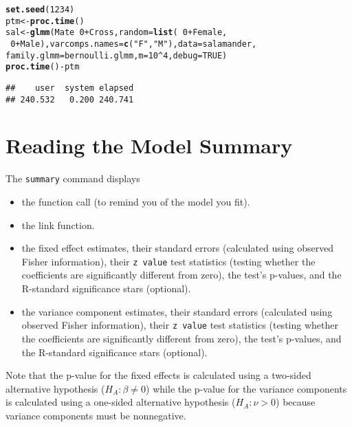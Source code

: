 \documentclass[11pt]{article}\usepackage[]{graphicx}\usepackage[]{color}
\makeatletter
\newcommand{\hlnum}[1]{\textcolor[rgb]{0.686,0.059,0.569}{#1}}%
\newcommand{\hlstr}[1]{\textcolor[rgb]{0.192,0.494,0.8}{#1}}%
\newcommand{\hlopt}[1]{\textcolor[rgb]{0,0,0}{#1}}%
\newcommand{\hlstd}[1]{\textcolor[rgb]{0.345,0.345,0.345}{#1}}%
\newcommand{\hlkwb}[1]{\textcolor[rgb]{0.69,0.353,0.396}{#1}}%
\newcommand{\hlkwc}[1]{\textcolor[rgb]{0.333,0.667,0.333}{#1}}%
\newcommand{\hlkwd}[1]{\textcolor[rgb]{0.737,0.353,0.396}{\textbf{#1}}}%
\newenvironment{kframe}{%
 \def\at@end@of@kframe{}%
 \ifinner\ifhmode%
  \def\at@end@of@kframe{\end{minipage}}%
  \begin{minipage}{\columnwidth}%
 \fi\fi%
 \def\FrameCommand##1{\hskip\@totalleftmargin \hskip-\fboxsep
 \colorbox{shadecolor}{##1}\hskip-\fboxsep
     \hskip-\linewidth \hskip-\@totalleftmargin \hskip\columnwidth}%
 \MakeFramed {\advance\hsize-\width
   \@totalleftmargin\z@ \linewidth\hsize
   \@setminipage}}%
 {\par\unskip\endMakeFramed%
 \at@end@of@kframe}
\newenvironment{knitrout}{}{} %
\makeatother
\begin{document}
\begin{knitrout}
\color{fgcolor}\begin{kframe}
\begin{alltt}
\hlkwd{set.seed}\hlstd{(}\hlnum{1234}\hlstd{)}
\hlstd{ptm}\hlkwb{<-}\hlkwd{proc.time}\hlstd{()}
\hlstd{sal} \hlkwb{<-} \hlkwd{glmm}\hlstd{(Mate} \hlopt{~} \hlnum{0} \hlopt{+} \hlstd{Cross,} \hlkwc{random} \hlstd{=} \hlkwd{list}\hlstd{(}\hlopt{~} \hlnum{0} \hlopt{+} \hlstd{Female,}
\hlopt{~} \hlnum{0} \hlopt{+} \hlstd{Male),} \hlkwc{varcomps.names} \hlstd{=} \hlkwd{c}\hlstd{(}\hlstr{"F"}\hlstd{,} \hlstr{"M"}\hlstd{),} \hlkwc{data} \hlstd{= salamander,}
\hlkwc{family.glmm} \hlstd{= bernoulli.glmm,} \hlkwc{m} \hlstd{=} \hlnum{10}\hlopt{^}\hlnum{4}\hlstd{,} \hlkwc{debug} \hlstd{=} \hlnum{TRUE}\hlstd{)}
\hlkwd{proc.time}\hlstd{()} \hlopt{-} \hlstd{ptm}
\end{alltt}
\begin{verbatim}
##    user  system elapsed 
## 240.532   0.200 240.741
\end{verbatim}
\end{kframe}
\end{knitrout}


\section{Reading the Model Summary}\label{sec:summary}

The \texttt{summary} command displays
\begin{itemize}
\item the function call (to remind you of the model you fit).
\item the link function.
\item the fixed effect estimates, their standard errors (calculated using observed Fisher information), their \texttt{z value} test statistics (testing whether the coefficients are significantly different from zero), the test's p-values, and the R-standard significance stars (optional).
\item the variance component estimates, their standard errors (calculated using observed Fisher information), their \texttt{z value} test statistics (testing whether the coefficients are significantly different from zero), the test's p-values, and the R-standard significance stars (optional).
\end{itemize}



Note that the p-value for the fixed effects is calculated using a two-sided alternative hypothesis ($H_A: \beta \neq 0$) while the p-value for the variance components is calculated using a one-sided alternative hypothesis ($H_A: \nu >0$) because variance components must be nonnegative.\\
\end{document}
